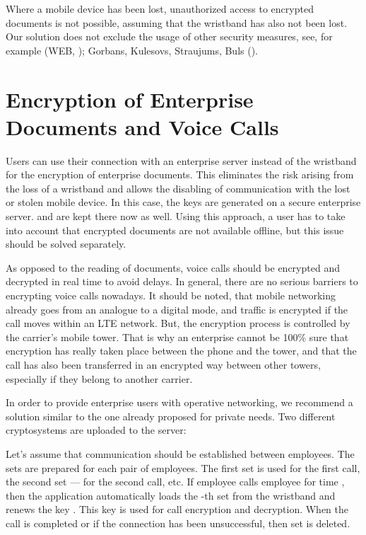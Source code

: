 \documentclass{bjmc}
\begin{document}
Where a mobile device has been lost, unauthorized access to encrypted documents is not possible, assuming that the wristband has also not been lost.
Our solution does not exclude the usage of other security measures, see, for example (WEB, \cite{Gar});  Gorbans,  Kulesovs,  Straujums,  Buls (\cite{Gor}). 

\section{Encryption of Enterprise Documents and Voice Calls}

Users can use their connection with an enterprise server instead of the wristband for the encryption of enterprise documents.  This eliminates the risk arising from the loss of a wristband
and allows the disabling of communication with the lost or stolen mobile device. In this case, the keys are generated on a secure enterprise server. 
 and  are kept there now as well. Using this approach, a user has to take into account that encrypted documents are not available offline, but this issue should be 
solved separately.


As opposed to the reading of documents, voice calls should be encrypted and decrypted in real time to avoid delays.
In general, there are no serious barriers to encrypting voice calls nowadays. It should be noted, that mobile networking already goes from an analogue 
to a digital mode, and traffic is encrypted if the call moves within an LTE network. But, the encryption process is controlled by the carrier's mobile tower. 
That is why an enterprise cannot be 100\%  sure that encryption has really taken place between the phone and the tower, and that the call has also been transferred in 
an encrypted way between other towers, especially if they belong to another carrier.

In order to provide enterprise users with operative networking, we recommend a solution similar to the one already proposed for private needs. Two different cryptosystems 
are uploaded to the server:


Let's assume that communication should be established between  employees. 
The  sets are prepared for each pair of  employees. The first set is used for the first call, the second set --- for the second call, etc. If  employee calls 
employee for time  , then the application  automatically loads the 
-th set  from the wristband and renews
 the key . This key is used for call encryption and decryption. When the call is completed or if the connection has been unsuccessful, then
 set 
 is deleted.
\end{document}
